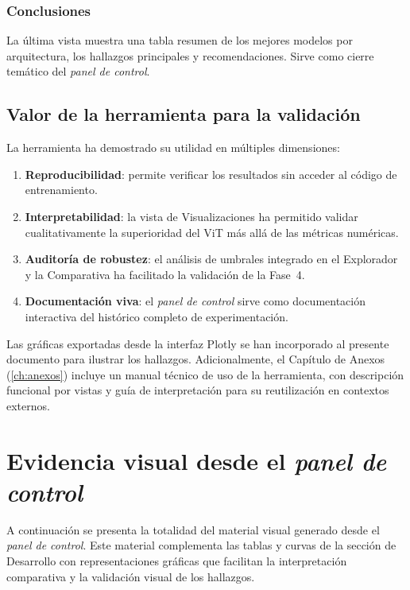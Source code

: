 \subsubsection{Conclusiones}

La última vista muestra una tabla resumen de los mejores modelos por arquitectura, los hallazgos principales y recomendaciones. Sirve como cierre temático del \textit{panel de control}.

\subsection{Valor de la herramienta para la validación}

La herramienta ha demostrado su utilidad en múltiples dimensiones:
\begin{enumerate}
    \item \textbf{Reproducibilidad}: permite verificar los resultados sin acceder al código de entrenamiento.
    \item \textbf{Interpretabilidad}: la vista de Visualizaciones ha permitido validar cualitativamente la superioridad del \acrshort{ViT} más allá de las métricas numéricas.
    \item \textbf{Auditoría de robustez}: el análisis de umbrales integrado en el Explorador y la Comparativa ha facilitado la validación de la Fase~4.
    \item \textbf{Documentación viva}: el \textit{panel de control} sirve como documentación interactiva del histórico completo de experimentación.
\end{enumerate}
Las gráficas exportadas desde la interfaz Plotly se han incorporado al presente documento para ilustrar los hallazgos. Adicionalmente, el Capítulo de Anexos (\ref{ch:anexos}) incluye un manual técnico de uso de la herramienta, con descripción funcional por vistas y guía de interpretación para su reutilización en contextos externos.


\section{Evidencia visual desde el \textit{panel de control}}
\label{sec:evidencia_visual}

A continuación se presenta la totalidad del material visual generado desde el \textit{panel de control}. Este material complementa las tablas y curvas de la sección de Desarrollo con representaciones gráficas que facilitan la interpretación comparativa y la validación visual de los hallazgos.

